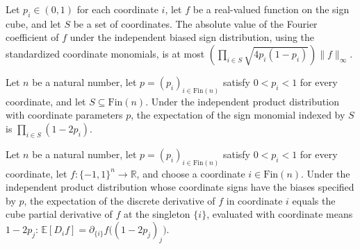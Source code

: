 \begin{theorem}
\label{FABL.abs_heterogeneousBiasedFourierCoeff_le}
\leanok
{}
Let $p_i\in(0,1)$ for each coordinate $i$, let $f$ be a real-valued function on the
sign cube, and let $S$ be a set of coordinates. The absolute value of the Fourier
coefficient of $f$ under the independent biased sign distribution, using the
standardized coordinate monomials, is at most $\left(\prod_{i\in
S}\sqrt{4p_i(1-p_i)}\right)\|f\|_\infty$.
\end{theorem}

\begin{theorem}
\label{FABL.pmfExpectation_heterogeneousBiasedSignPMF_monomial}
\leanok
{}
Let $n$ be a natural number, let $p=(p_i)_{i\in\mathrm{Fin}(n)}$ satisfy $0<p_i<1$ for
every coordinate, and let $S\subseteq\mathrm{Fin}(n)$. Under the independent product
distribution with coordinate parameters $p$, the expectation of the sign monomial
indexed by $S$ is $\prod_{i\in S}(1-2p_i)$.
\end{theorem}

\begin{theorem}
\label{FABL.pmfExpectation_heterogeneousBiasedSignPMF_discreteDerivative}
\leanok
{}
Let $n$ be a natural number, let $p=(p_i)_{i\in\mathrm{Fin}(n)}$ satisfy $0<p_i<1$ for
every coordinate, let $f:\{-1,1\}^n\to\mathbb{R}$, and choose a coordinate
$i\in\mathrm{Fin}(n)$. Under the independent product distribution whose coordinate signs
have the biases specified by $p$, the expectation of the discrete derivative of $f$ in
coordinate $i$ equals the cube partial derivative of $f$ at the singleton $\{i\}$,
evaluated with coordinate means $1-2p_j$: $\mathbb{E}[D_i
f]=\partial_{\{i\}}f\bigl((1-2p_j)_j\bigr)$.
\end{theorem}

